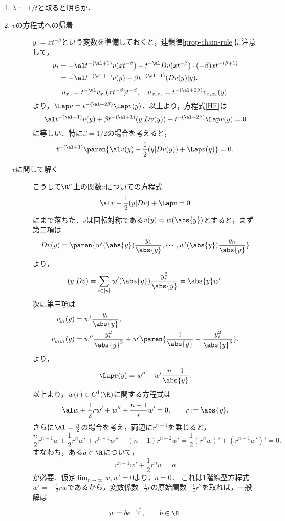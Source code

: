 \documentclass[uplatex,dvipdfmx]{jsreport}
\begin{document}
\begin{Proof}\mbox{}
    \begin{enumerate}
        \item $\lambda:=1/t$と取ると明らか．
        \item 
        \begin{description}
            \item[$v$の方程式への帰着] $y:=xt^{-\beta}$という変数を準備しておくと，連鎖律\ref{prop-chain-rule}に注意して，
            \begin{align*}
                u_t&=-\al t^{-(\al+1)}v(xt^{-\beta})+t^{-\al}Dv(xt^{-\beta})\cdot(-\beta)xt^{-(\beta+1)}\\
                &=-\al t^{-(\al+1)}v(y)-\beta t^{-(\al+1)}(Dv(y)|y).
            \end{align*}
            \[u_{x_i}=t^{-\al}v_{x_i}(xt^{-\beta})t^{-\beta},\quad u_{x_ix_i}=t^{-(\al+2\beta)}v_{x_ix_i}(y).\]
            より，$\Lap u=t^{-(\al+2\beta)}\Lap v(y)$．以上より，方程式\ref{HE}は
            \[\al t^{-(\al+1)}v(y)+\beta t^{-(\al+1)}(y|Dv(y))+t^{-(\al+2\beta)}\Lap v(y)=0\]
            に等しい．特に$\beta=1/2$の場合を考えると，
            \[t^{-(\al+1)}\paren{\al v(y)+\frac{1}{2}(y|Dv(y))+\Lap v(y)}=0.\]
            \item[$v$に関して解く] こうして$\R^n$上の関数$v$についての方程式
            \[\al v+\frac{1}{2}(y|Dv)+\Lap v=0\]
            にまで落ちた．$v$は回転対称である$v(y)=w(\abs{y})$とすると，まず第二項は
            \[Dv(y)=\paren{w'(\abs{y})\frac{y_1}{\abs{y}},\cdots,w'(\abs{y})\frac{y_n}{\abs{y}}}\]
            より，
            \[(y|Dv)=\sum_{i\in[n]}w'(\abs{y})\frac{y_i^2}{\abs{y}}=\abs{y}w'.\]
            次に第三項は
            \begin{align*}
                v_{y_i}(y)&=w'\frac{y_i}{\abs{y}},\\
                v_{y_iy_i}(y)&=w''\frac{y^2_i}{\abs{y}^2}+w'\paren{\frac{1}{\abs{y}}-\frac{y_i^2}{\abs{y}^3}}.
            \end{align*}
            より，
            \[\Lap v(y)=w''+w'\frac{n-1}{\abs{y}}.\]
            以上より，$w(r)\in C^1(\R)$に関する方程式は
            \[\al w+\frac{1}{2}rw'+w''+\frac{n-1}{r}w'=0,\qquad r:=\abs{y}.\]
            さらに$\al=\frac{n}{2}$の場合を考え，両辺に$r^{n-1}$を乗じると，
            \[\frac{n}{2}r^{n-1}w+\frac{1}{2}r^nw'+r^{n-1}w''+(n-1)r^{n-2}w'=\frac{1}{2}(r^nw)'+(r^{n-1}w')'=0.\]
            すなわち，ある$a\in\R$について，
            \[r^{n-1}w'+\frac{1}{2}r^nw=a\]
            が必要．仮定$\lim_{r\to\infty}w,w'=0$より，$a=0$．
            これは1階線型方程式$w'=-\frac{1}{2}rw$であるから，変数係数$-\frac{1}{2}r$の原始関数$-\frac{1}{4}r^2$を取れば，一般解は
            \[w=be^{-\frac{r^2}{4}},\qquad b\in\R.\]
        \end{description}
    \end{enumerate}
\end{Proof}
\end{document}
